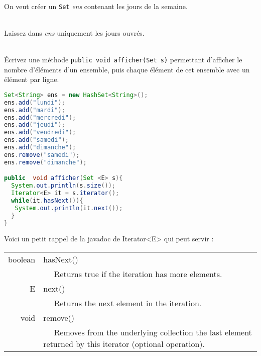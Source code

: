 \documentclass[iutinfo,a4paper,nocorrections,10pt]{ustl-tdtp}
\begin{document}
%




~\\ \question On veut créer un \texttt{Set} {\it ens}  contenant les jours de la semaine. 

~\\ \question Laissez dans {\it ens} uniquement les jours ouvrés. 

~\\ \question Écrivez une méthode \texttt{public void afficher(Set s)} permettant d'afficher le nombre d'éléments d'un ensemble, puis chaque élément de cet ensemble avec un élément par ligne.

\begin{correction}
{\color{red}
\begin{lstlisting}[language=Java]
Set<String> ens = new HashSet<String>();
ens.add("lundi"); 
ens.add("mardi");
ens.add("mercredi");
ens.add("jeudi");
ens.add("vendredi");
ens.add("samedi");
ens.add("dimanche");
ens.remove("samedi");
ens.remove("dimanche");

public  void afficher(Set <E> s){
  System.out.println(s.size());
  Iterator<E> it = s.iterator();
  while(it.hasNext()){
   System.out.println(it.next());
  }
}
\end{lstlisting}
}

\end{correction}


Voici un petit rappel de la javadoc de Iterator<E> qui peut servir :
 \begin{center}
\begin{tabular}{|r|l|}
\hline
 boolean	&hasNext()  \\
         & ~~ Returns true if the iteration has more elements.  \\
\hline
 E	&next()  \\
          &~~ Returns the next element in the iteration.  \\
\hline
 void&	remove()  \\
        & ~~ Removes from the underlying collection the last element returned by this iterator (optional operation).  \\


\hline
\end{tabular}
\end{center}
\end{document}
